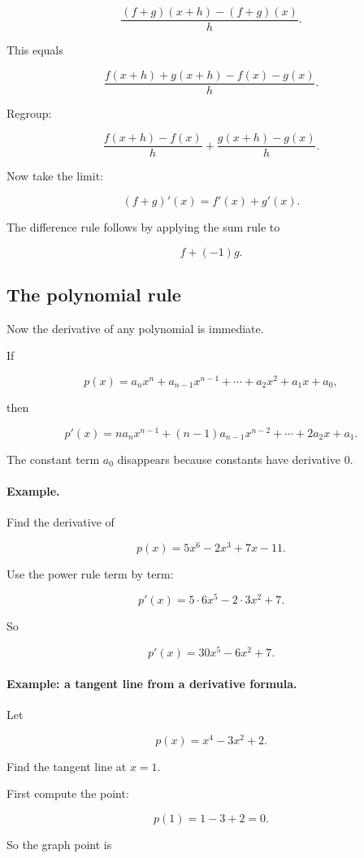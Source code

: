 \[
\frac{(f+g)(x+h)-(f+g)(x)}{h}.
\]

This equals

\[
\frac{f(x+h)+g(x+h)-f(x)-g(x)}{h}.
\]

Regroup:

\[
\frac{f(x+h)-f(x)}{h}
+
\frac{g(x+h)-g(x)}{h}.
\]

Now take the limit:

\[
(f+g)'(x)=f'(x)+g'(x).
\]

The difference rule follows by applying the sum rule to

\[
f+(-1)g.
\]

\subsection{The polynomial rule}
\label{subsec:polynomial-rule}

Now the derivative of any polynomial is immediate.

If

\[
p(x)=a_nx^n+a_{n-1}x^{n-1}+\cdots+a_2x^2+a_1x+a_0,
\]

then

\[
\boxed{
p'(x)
=
na_nx^{n-1}+(n-1)a_{n-1}x^{n-2}+\cdots+2a_2x+a_1.
}
\]

The constant term \(a_0\) disappears because constants have derivative \(0\).

\paragraph{Example.}
Find the derivative of

\[
p(x)=5x^6-2x^3+7x-11.
\]

Use the power rule term by term:

\[
p'(x)
=
5\cdot6x^5-2\cdot3x^2+7.
\]

So

\[
\boxed{
p'(x)=30x^5-6x^2+7.
}
\]

\paragraph{Example: a tangent line from a derivative formula.}
Let

\[
p(x)=x^4-3x^2+2.
\]

Find the tangent line at \(x=1\).

First compute the point:

\[
p(1)=1-3+2=0.
\]

So the graph point is

